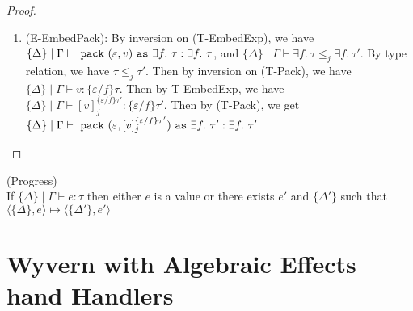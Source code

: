 \begin{lemma}
\begin{proof}
\begin{enumerate}
\item (E-EmbedPack): By inversion on (T-EmbedExp), we have $\{\Delta\} \mid \Gamma \vdash \ \texttt{pack}\  (\varepsilon, v) \ \texttt{as}\  \exists f.\ \tau : \exists f.\ \tau$, and $\{\Delta\} \mid \Gamma \vdash \exists f.\ \tau \leq_j \exists f.\ \tau'$. By type relation, we have $\tau \leq_j \tau'$. Then by inversion on (T-Pack), we have $\{\Delta\} \mid \Gamma \vdash v :\{\varepsilon / f\}\tau$. Then by T-EmbedExp, we have $\{\Delta\}\mid\Gamma \vdash [v]^{\{\varepsilon / f\}\tau'}_j : \{\varepsilon / f\}\tau'$. Then by (T-Pack), we get $\{\Delta\}\mid\Gamma \vdash \ \texttt{pack}\  (\varepsilon, [v]^{\{\varepsilon / f\}\tau'}_j) \ \texttt{as}\  \exists f.\ \tau' :\exists f.\ \tau'$


\end{enumerate}
\end{proof}

\end{lemma}

\begin{lemma} (Progress)\\
If $\{\Delta\} \mid \Gamma \vdash e : \tau$ then either $e$ is a value or there exists $e'$ and $\{\Delta'\}$ such that $\langle \{\Delta\}, e \rangle \mapsto \langle \{\Delta'\}, e' \rangle$
\end{lemma}


\section{Wyvern with Algebraic Effects hand Handlers}

